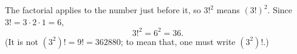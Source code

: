The factorial applies to the number just before it, so $3!^2$ means $(3!)^2$. Since $3!=3\cdot2\cdot1=6$,
\[
3!^2=6^2=\boxed{36}.
\]
(It is not $(3^2)!=9!=362880$; to mean that, one must write $\left(3^2\right)!$.)
